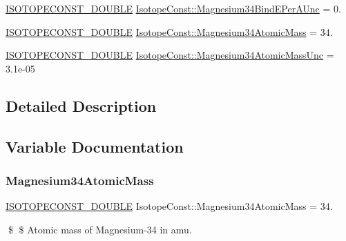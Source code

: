 \begin{DoxyCompactItemize}
\mbox{\hyperlink{group___isotope_const-_macros_ga8f45a7272ce02c0b4c65c44636ed719a}{I\+S\+O\+T\+O\+P\+E\+C\+O\+N\+S\+T\+\_\+\+D\+O\+U\+B\+LE}} \mbox{\hyperlink{group___isotope_const-_magnesium-_mg34_ga3f49675539b2a955c6e3c08ff15c4acd}{Isotope\+Const\+::\+Magnesium34\+Bind\+E\+Per\+A\+Unc}} = 0.
\item 
\mbox{\hyperlink{group___isotope_const-_macros_ga8f45a7272ce02c0b4c65c44636ed719a}{I\+S\+O\+T\+O\+P\+E\+C\+O\+N\+S\+T\+\_\+\+D\+O\+U\+B\+LE}} \mbox{\hyperlink{group___isotope_const-_magnesium-_mg34_ga76b047115fe04d9750a6ced5f3cbbc2d}{Isotope\+Const\+::\+Magnesium34\+Atomic\+Mass}} = 34.
\item 
\mbox{\hyperlink{group___isotope_const-_macros_ga8f45a7272ce02c0b4c65c44636ed719a}{I\+S\+O\+T\+O\+P\+E\+C\+O\+N\+S\+T\+\_\+\+D\+O\+U\+B\+LE}} \mbox{\hyperlink{group___isotope_const-_magnesium-_mg34_ga0d1689a7a295e93a3d86132be85abe00}{Isotope\+Const\+::\+Magnesium34\+Atomic\+Mass\+Unc}} = 3.\+1e-\/05
\end{DoxyCompactItemize}


\subsection{Detailed Description}


\subsection{Variable Documentation}
\mbox{\label{group___isotope_const-_magnesium-_mg34_ga76b047115fe04d9750a6ced5f3cbbc2d}} 
\subsubsection{\texorpdfstring{Magnesium34\+Atomic\+Mass}{Magnesium34AtomicMass}}
{\footnotesize\ttfamily \mbox{\hyperlink{group___isotope_const-_macros_ga8f45a7272ce02c0b4c65c44636ed719a}{I\+S\+O\+T\+O\+P\+E\+C\+O\+N\+S\+T\+\_\+\+D\+O\+U\+B\+LE}} Isotope\+Const\+::\+Magnesium34\+Atomic\+Mass = 34.}

\$ \$ Atomic mass of Magnesium-\/34 in amu. \mbox{\label{group___isotope_const-_magnesium-_mg34_ga0d1689a7a295e93a3d86132be85abe00}} 
